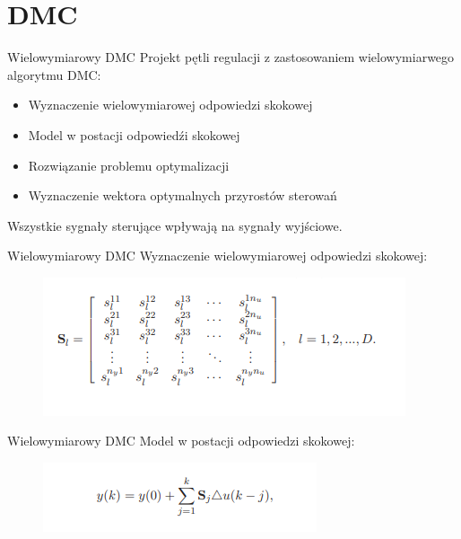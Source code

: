 \section{DMC}
\begin{frame}{Wielowymiarowy DMC}
Projekt pętli regulacji z zastosowaniem wielowymiarwego algorytmu DMC:
\begin{itemize}
    \item Wyznaczenie wielowymiarowej odpowiedzi skokowej 
    \item Model w postacji odpowiedźi skokowej
    \item Rozwiązanie problemu optymalizacji
    \item Wyznaczenie wektora optymalnych przyrostów sterowań
\end{itemize}
Wszystkie sygnały sterujące wpływają na sygnały wyjściowe. 
\end{frame}


\begin{frame}{Wielowymiarowy DMC}
Wyznaczenie wielowymiarowej odpowiedzi skokowej:
	\begin{center}
		\begin{figure}[H]
            		\includegraphics[scale=0.8]{images/wielowymiarowa_odp_DMC.png}
		\end{figure}
	\end{center}
\end{frame}

\begin{frame}{Wielowymiarowy DMC}
Model w postacji odpowiedzi skokowej:
	\begin{center}
		\begin{figure}[H]
            		\includegraphics[scale=0.9]{images/model_DMC.png}
		\end{figure}
	\end{center}
\end{frame}

